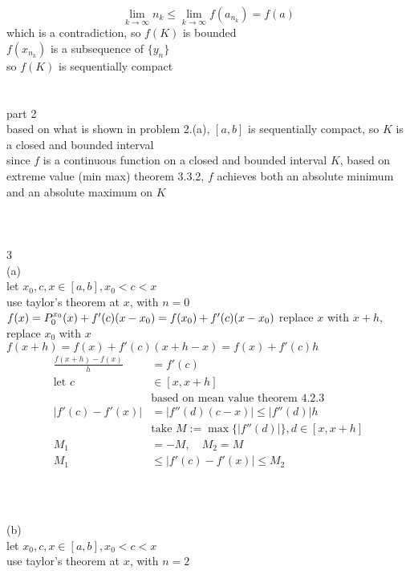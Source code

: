 \documentclass[12pt, border = 4pt, multi]{article} %
\begin{document}
\[\lim_{k \rightarrow \infty} n_k \leq \lim_{k \rightarrow \infty} f(a_{n_k}) = f(a)\]
which is a contradiction, so $f(K)$ is bounded\\
$f(x_{n_k})$ is a subsequence of $\{y_n\}$\\
so $f(K)$ is sequentially compact\\
\\
\\
part 2\\
based on what is shown in problem 2.(a), $[a, b]$ is sequentially compact, so $K$ is a closed and bounded interval\\
since $f$ is a continuous function on a closed and bounded interval $K$, based on extreme value (min max) theorem 3.3.2, $f$ achieves both an absolute minimum and an absolute maximum on $K$\\
\\
\\
\\
3\\
(a)\\
let $x_0, c, x \in [a, b], x_0 < c < x$\\
use taylor's theorem at $x$, with $n = 0$\\
$f(x) = P_0 ^ {x_0}(x) + f'(c)(x - x_0) = f(x_0) + f'(c)(x - x_0)\\$
replace $x$ with $x + h$, replace $x_0$ with $x$\\
$f(x + h) = f(x) + f'(c)(x + h - x) = f(x) + f'(c)h$
\begin{align*}
\frac{f(x + h) - f(x)}{h} &= f'(c)\\
\text{let } c &\in [x, x + h]\\
&\text{based on mean value theorem 4.2.3}\\
|f'(c) - f'(x)| &= |f''(d)(c - x)| \leq |f''(d)|h\\
&\text{take } M := \max\{|f''(d)|\}, d \in [x, x + h]\\
M_1 &= -M,\quad M_2 = M\\
M_1 &\leq |f'(c) - f'(x)| \leq M_2\\
\end{align*}
\\
\\
\\
(b)\\
let $x_0, c, x \in [a, b], x_0 < c < x$\\
use taylor's theorem at $x$, with $n = 2$
\end{document}
